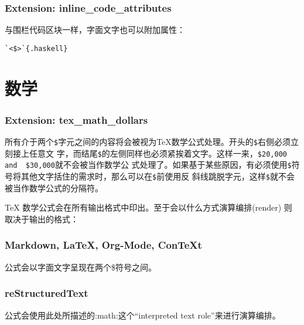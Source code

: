 \documentclass[fancyhdr,bookmark]{ctexbook}
\newcommand{\passthrough}[1]{#1}
\begin{document}
\hypertarget{extension-inline_code_attributes}{%
\subsubsection{Extension:
inline\_code\_attributes}\label{extension-inline_code_attributes}}

与围栏代码区块一样，字面文字也可以附加属性：

\begin{lstlisting}
`<$>`{.haskell}
\end{lstlisting}

\hypertarget{ux6570ux5b66}{%
\section{数学}\label{ux6570ux5b66}}

\hypertarget{extension-tex_math_dollars}{%
\subsubsection{Extension:
tex\_math\_dollars}\label{extension-tex_math_dollars}}

所有介于两个\passthrough{\lstinline!$!}字元之间的内容将会被视为TeX数学公式处理。开头的\passthrough{\lstinline!$!}右侧必须立刻接上任意文
字，而结尾\passthrough{\lstinline!$!}的左侧同样也必须紧挨着文字。这样一来，\passthrough{\lstinline!$20,000  and  $30,000!}就不会被当作数学公
式处理了。如果基于某些原因，有必须使用\passthrough{\lstinline!$!}符号将其他文字括住的需求时，那么可以在\passthrough{\lstinline!$!}前使用反
斜线跳脱字元，这样\passthrough{\lstinline!$!}就不会被当作数学公式的分隔符。

TeX 数学公式会在所有输出格式中印出。至于会以什么方式演算编排(render)
则取决于输出的格式：

\hypertarget{markdown-latex-org-mode-context}{%
\subsubsection{Markdown, LaTeX, Org-Mode,
ConTeXt}\label{markdown-latex-org-mode-context}}

公式会以字面文字呈现在两个\$符号之间。

\hypertarget{restructuredtext}{%
\subsubsection{reStructuredText}\label{restructuredtext}}

公式会使用此处所描述的:math:这个``interpreted text
role''来进行演算编排。
\end{document}
